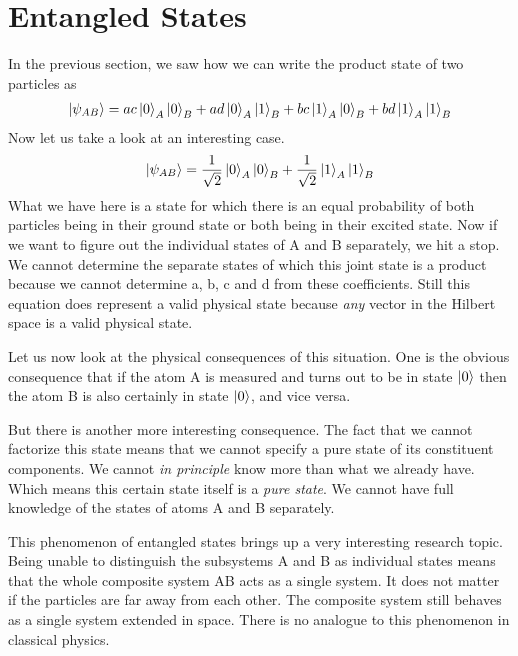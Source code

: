 \section{Entangled States}
\par In the previous section, we saw how we can write the product state of two particles as
\begin{align*}
\ket{\psi_{AB}} = ac \ket{0}_A \ket{0}_B + ad \ket{0}_A \ket{1}_B + bc \ket{1}_A \ket{0}_B + bd \ket{1}_A \ket{1}_B
\end{align*}
Now let us take a look at an interesting case.
\begin{align*}
  \ket{\psi_{AB}} = \frac{1}{\sqrt{2}} \ket{0}_A \ket{0}_B + \frac{1}{\sqrt{2}} \ket{1}_A \ket{1}_B 
\end{align*}
What we have here is a state for which there is an equal probability of both particles being in their ground state or both being in their excited state. Now if we want to figure out the individual states of A and B separately, we hit a stop. We cannot determine the separate states of which this joint state is a product because we cannot determine a, b, c and d from these coefficients. Still this equation does represent a valid physical state because \textit{any} vector in the Hilbert space is a valid physical state.
\par Let us now look at the physical consequences of this situation. One is the obvious consequence that if the atom A is measured and turns out to be in state $\ket{0}$ then the atom B is also certainly in state $\ket{0}$, and vice versa.
\par But there is another more interesting consequence. The fact that we cannot factorize this state means that we cannot specify a pure state of its constituent components. We cannot \textit{in principle} know more than what we already have. Which means this certain state itself is a \textit{pure state}. We cannot have full knowledge of the states of atoms A and B separately.
\par This phenomenon of entangled states brings up a very interesting research topic. Being unable to distinguish the subsystems A and B as individual states means that the whole composite system AB acts as a single system. It does not matter if the particles are far away from each other. The composite system still behaves as a single system extended in space. There is no analogue to this phenomenon in classical physics.
